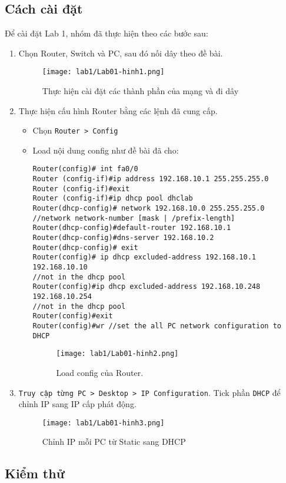 \documentclass[]{article}
\begin{document}
\subsection{Cách cài đặt}
Để cài đặt Lab 1, nhóm đã thực hiện theo các bước sau:
\begin{enumerate}
\item Chọn Router, Switch và PC, sau đó nối dây theo đề bài.
\begin{figure}[H]
    \centering
    \texttt{[image: lab1/Lab01-hinh1.png]}
    \caption{Thực hiện cài đặt các thành phần của mạng và đi dây}
\end{figure}
\item Thực hiện cấu hình Router bằng các lệnh đã cung cấp.
\begin{itemize}
\item Chọn \texttt{Router > Config}
\item Load nội dung config như đề bài đã cho:
\begin{lstlisting}
Router(config)# int fa0/0
Router (config-if)#ip address 192.168.10.1 255.255.255.0
Router (config-if)#exit
Router (config-if)#ip dhcp pool dhclab
Router(dhcp-config)# network 192.168.10.0 255.255.255.0
//network network-number [mask | /prefix-length]
Router(dhcp-config)#default-router 192.168.10.1
Router(dhcp-config)#dns-server 192.168.10.2
Router(dhcp-config)# exit
Router(config)# ip dhcp excluded-address 192.168.10.1 192.168.10.10
//not in the dhcp pool
Router(config)#ip dhcp excluded-address 192.168.10.248 192.168.10.254
//not in the dhcp pool
Router(config)#exit
Router(config)#wr //set the all PC network configuration to DHCP
\end{lstlisting}
\begin{figure}[H]
    \centering
    \texttt{[image: lab1/Lab01-hinh2.png]}
    \caption{Load config của Router.}
\end{figure}
\end{itemize}
\item \texttt{Truy cập từng PC > Desktop > IP Configuration}. Tick phần \texttt{DHCP} để chỉnh IP sang IP cấp phát động.\label{checkDHCP}
\begin{figure}[H]
    \centering
    \texttt{[image: lab1/Lab01-hinh3.png]}
    \caption{Chỉnh IP mỗi PC từ Static sang DHCP}
\end{figure}
\end{enumerate}

\subsection{Kiểm thử}
\end{document}
